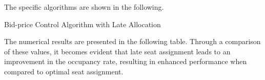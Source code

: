 
The specific algorithms are shown in the following.

\begin{algorithm}[H]
  \caption{Bid-price Control Algorithm with Late Allocation}\label{algo_bid_late}
\end{algorithm}


The numerical results are presented in the following table. Through a comparison of these values, it becomes evident that late seat assignment leads to an improvement in the occupancy rate, resulting in enhanced performance when compared to optimal seat assignment.

